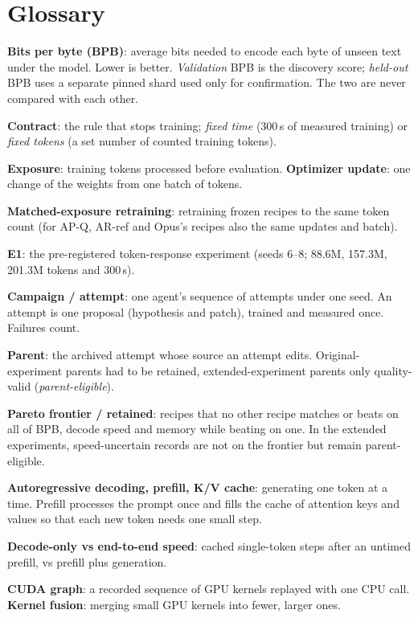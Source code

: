 \documentclass{article}
\newif\ifshowhumanmarkers \showhumanmarkersfalse
\newcommand{\humantag}[1]{{\color{humanframe}\sffamily\scriptsize\bfseries HUMAN AUTHOR MUST REWRITE/VERIFY [#1]}\ }
\newcommand{\humanauthor}[2][]{\ifshowhumanmarkers\begin{humanbox}\humantag{#1}#2\end{humanbox}\else #2\par\fi}
\begin{document}
\section{Glossary}\label{app:glossary}
\humanauthor[P2-01 Glossary]{\textbf{Bits per byte (BPB)}: average bits needed to encode each byte of unseen text under the model. Lower is better. \emph{Validation} BPB is the discovery score; \emph{held-out} BPB uses a separate pinned shard used only for confirmation. The two are never compared with each other.\par
\textbf{Contract}: the rule that stops training; \emph{fixed time} (300\,s of measured training) or \emph{fixed tokens} (a set number of counted training tokens).\par
\textbf{Exposure}: training tokens processed before evaluation. \textbf{Optimizer update}: one change of the weights from one batch of tokens.\par
\textbf{Matched-exposure retraining}: retraining frozen recipes to the same token count (for AP-Q, AR-ref and Opus's recipes also the same updates and batch).\par
\textbf{E1}: the pre-registered token-response experiment (seeds 6--8; 88.6M, 157.3M, 201.3M tokens and 300\,s).\par
\textbf{Campaign / attempt}: one agent's sequence of attempts under one seed. An attempt is one proposal (hypothesis and patch), trained and measured once. Failures count.\par
\textbf{Parent}: the archived attempt whose source an attempt edits. Original-experiment parents had to be retained, extended-experiment parents only quality-valid (\emph{parent-eligible}).\par
\textbf{Pareto frontier / retained}: recipes that no other recipe matches or beats on all of BPB, decode speed and memory while beating on one. In the extended experiments, speed-uncertain records are not on the frontier but remain parent-eligible.\par
\textbf{Autoregressive decoding, prefill, K/V cache}: generating one token at a time. Prefill processes the prompt once and fills the cache of attention keys and values so that each new token needs one small step.\par
\textbf{Decode-only vs end-to-end speed}: cached single-token steps after an untimed prefill, vs prefill plus generation.\par
\textbf{CUDA graph}: a recorded sequence of GPU kernels replayed with one CPU call. \textbf{Kernel fusion}: merging small GPU kernels into fewer, larger ones.\par
}
\end{document}
